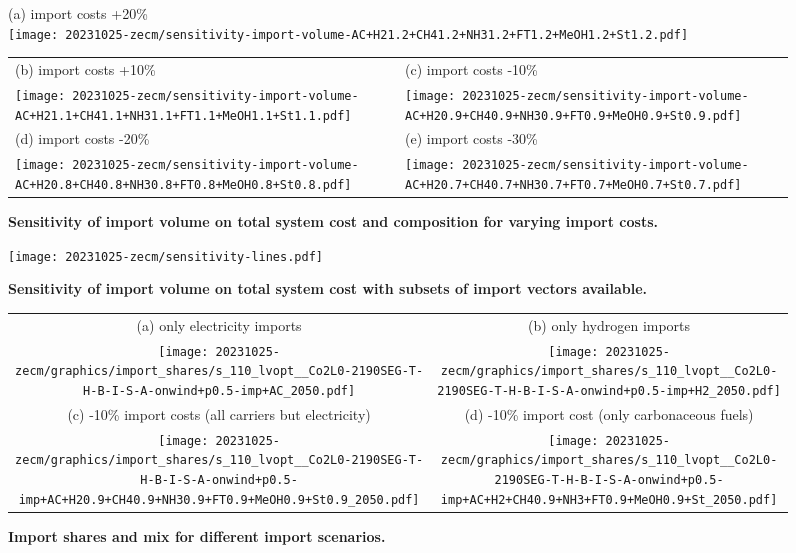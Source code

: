 \begin{figure*}
    \small
    (a) import costs +20\% \\
    \texttt{[image: 20231025-zecm/sensitivity-import-volume-AC+H21.2+CH41.2+NH31.2+FT1.2+MeOH1.2+St1.2.pdf]}
    \begin{tabular}{ll}
        (b) import costs +10\% & (c) import costs -10\% \\
        \texttt{[image: 20231025-zecm/sensitivity-import-volume-AC+H21.1+CH41.1+NH31.1+FT1.1+MeOH1.1+St1.1.pdf]} &
        \texttt{[image: 20231025-zecm/sensitivity-import-volume-AC+H20.9+CH40.9+NH30.9+FT0.9+MeOH0.9+St0.9.pdf]} \\
        (d) import costs -20\% & (e) import costs -30\% \\
        \texttt{[image: 20231025-zecm/sensitivity-import-volume-AC+H20.8+CH40.8+NH30.8+FT0.8+MeOH0.8+St0.8.pdf]} &
        \texttt{[image: 20231025-zecm/sensitivity-import-volume-AC+H20.7+CH40.7+NH30.7+FT0.7+MeOH0.7+St0.7.pdf]}
    \end{tabular}
    \caption{\textbf{Sensitivity of import volume on total system cost and composition for varying import costs.}}
    \label{fig:si:volume}
\end{figure*}


\begin{figure*}
    \texttt{[image: 20231025-zecm/sensitivity-lines.pdf]}
    \caption{\textbf{Sensitivity of import volume on total system cost with subsets of import vectors available.}}
    \label{fig:si:volume-subsets}
\end{figure*}

\begin{figure*}
    \footnotesize
    \begin{tabular}{cc}
        (a) only electricity imports & (b) only hydrogen imports \\
        \texttt{[image: 20231025-zecm/graphics/import\_shares/s\_110\_lvopt\_\_Co2L0-2190SEG-T-H-B-I-S-A-onwind+p0.5-imp+AC\_2050.pdf]} &
        \texttt{[image: 20231025-zecm/graphics/import\_shares/s\_110\_lvopt\_\_Co2L0-2190SEG-T-H-B-I-S-A-onwind+p0.5-imp+H2\_2050.pdf]} \\
        (c) -10\% import costs (all carriers but electricity) & (d) -10\% import cost (only carbonaceous fuels) \\
        \texttt{[image: 20231025-zecm/graphics/import\_shares/s\_110\_lvopt\_\_Co2L0-2190SEG-T-H-B-I-S-A-onwind+p0.5-imp+AC+H20.9+CH40.9+NH30.9+FT0.9+MeOH0.9+St0.9\_2050.pdf]} &
        \texttt{[image: 20231025-zecm/graphics/import\_shares/s\_110\_lvopt\_\_Co2L0-2190SEG-T-H-B-I-S-A-onwind+p0.5-imp+AC+H2+CH40.9+NH3+FT0.9+MeOH0.9+St\_2050.pdf]} \\
    \end{tabular}
    \caption{\textbf{Import shares and mix for different import scenarios.}}
    \label{fig:si:import-shares}
\end{figure*}

